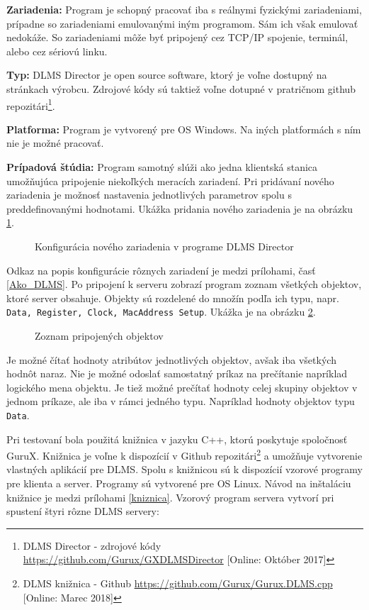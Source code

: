 \noindent \textbf{Zariadenia:} Program je schopný pracovať iba s reálnymi fyzickými zariadeniami, prípadne so zariadeniami emulovanými iným programom. Sám ich však emulovať nedokáže. So zariadeniami môže byť pripojený cez TCP/IP spojenie, terminál, alebo cez sériovú linku. \par
\noindent \textbf{Typ:} DLMS Director je open source software, ktorý je voľne dostupný na stránkach výrobcu. Zdrojové kódy sú taktiež voľne dotupné v pratričnom github repozitári\footnote{DLMS Director - zdrojové kódy \url{https://github.com/Gurux/GXDLMSDirector} [Online: Október 2017]}. \par
\noindent \textbf{Platforma:} Program je vytvorený pre OS Windows. Na iných platformách s ním nie je možné pracovať. \par
\noindent \textbf{Prípadová štúdia:} Program samotný slúži ako jedna klientská stanica umožňujúca pripojenie niekoľkých meracích zariadení. Pri pridávaní nového zariadenia je možnosť nastavenia jednotlivých parametrov spolu s preddefinovanými hodnotami. Ukážka pridania nového zariadenia je na obrázku \ref{DLMSConf}. 
\begin{figure}[h]
    \centering
    \caption{Konfigurácia nového zariadenia v programe DLMS Director}
\label{DLMSConf}
\end{figure}
Odkaz na popis konfigurácie rôznych zariadení je medzi prílohami, časť \ref{Ako_DLMS}. Po pripojení k serveru zobrazí program zoznam všetkých objektov, ktoré server obsahuje. Objekty sú rozdelené do množín podľa ich typu, napr. {\tt Data, Register, Clock, MacAddress Setup}. Ukážka je na obrázku \ref{DLMS_List}.
\begin{figure}[h]
    \centering
    \caption{Zoznam pripojených objektov}
\label{DLMS_List}
\end{figure}
Je možné čítať hodnoty atribútov jednotlivých objektov, avšak iba všetkých hodnôt naraz. Nie je možné odoslať samostatný príkaz na prečítanie napríklad logického mena objektu. Je tiež možné prečítať hodnoty celej skupiny objektov v jednom príkaze, ale iba v rámci jedného typu. Napríklad hodnoty objektov typu {\tt Data}. \par
Pri testovaní bola použitá knižnica v jazyku C++, ktorú poskytuje spoločnosť GuruX. Knižnica je voľne k dispozícií v Github repozitári\footnote{DLMS knižnica - Github \url{https://github.com/Gurux/Gurux.DLMS.cpp} [Online: Marec 2018]} a umožňuje vytvorenie vlastných aplikácií pre DLMS. Spolu s knižnicou sú k dispozícií vzorové programy pre klienta a server. Programy sú vytvorené pre OS Linux. Návod na inštaláciu knižnice je medzi prílohami \ref{kniznica}. Vzorový program servera vytvorí pri spustení štyri rôzne DLMS servery:
